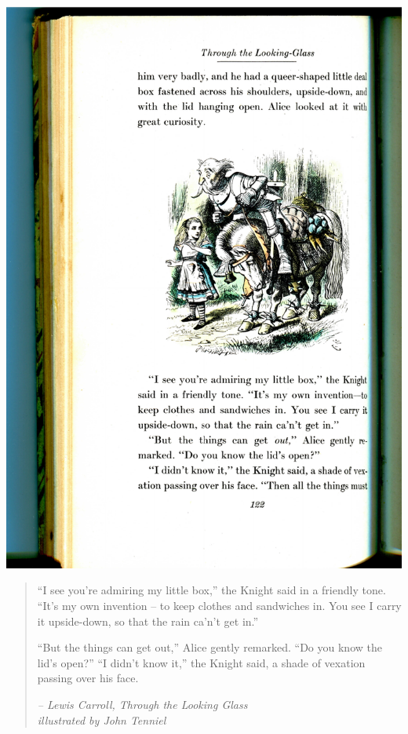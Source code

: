 \documentclass[11pt]{article}
\begin{document}
\centerline{\includegraphics{img/Tenniel-Knight}}

\begin{quotation}
``I see you're admiring my little box,''  the Knight said in a
friendly tone. ``It's my own invention -- to keep clothes and
sandwiches in. You see I carry it upside-down, so that the rain ca'n't
get in.''

``But the things can get out,'' Alice gently remarked. ``Do you know
the lid's open?''
``I didn't know it,''  the Knight said, a shade of vexation passing over his face.

\begin{flushright}
\em -- Lewis Carroll, Through the Looking Glass\\
 illustrated by John Tenniel
\end{flushright}
\end{quotation}
\end{document}
